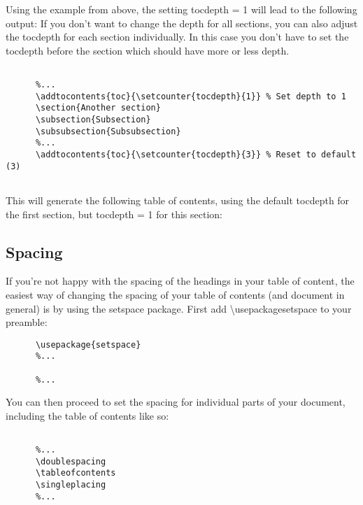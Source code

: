     Using the example from above, the setting tocdepth = 1 will lead to the following output:
    If you don't want to change the depth for all sections, you can also adjust the tocdepth for each section individually. In this case you don't have to set the tocdepth before the section which should have more or less depth.

    \begin{lstlisting}[language={[LaTeX]TeX}, breaklines=true,frame=single]
      %...
      
      %...
      \addtocontents{toc}{\setcounter{tocdepth}{1}} % Set depth to 1
      \section{Another section}
      \subsection{Subsection}
      \subsubsection{Subsubsection}
      %...
      \addtocontents{toc}{\setcounter{tocdepth}{3}} % Reset to default (3)
      
    \end{lstlisting}
     This will generate the following table of contents, using the default tocdepth for the first section, but tocdepth = 1 for this section:

  \subsection{Spacing}
    If you're not happy with the spacing of the headings in your table of content, the easiest way of changing the spacing of your table of contents (and document in general) is by using the setspace package. First add \textbackslash usepackage{setspace} to your preamble:
    \begin{lstlisting}[language={[LaTeX]TeX}, breaklines=true,frame=single]
      %...
      \usepackage{setspace}
      %...
      
      %...
    \end{lstlisting}
 
    You can then proceed to set the spacing for individual parts of your document, including the table of contents like so:
    \begin{lstlisting}[language={[LaTeX]TeX}, breaklines=true,frame=single]
      %...
      
      %...
      \doublespacing
      \tableofcontents
      \singleplacing
      %...
    \end{lstlisting}
 
